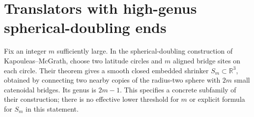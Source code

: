 \chapter{Translators with high-genus spherical-doubling ends}\label{sec:catalogue-sun-wang-sphere-doubling-translators}
\begin{example}\label{ex:catalogue-sun-wang-sphere-doubling-translators}
Fix an integer $m$ sufficiently large. In the spherical-doubling construction of Kapouleas--McGrath, choose two latitude circles and $m$ aligned bridge sites on each circle. Their theorem gives a smooth closed embedded shrinker $S_m\subset\mathbb R^3$, obtained by connecting two nearby copies of the radius-two sphere with $2m$ small catenoidal bridges. Its genus is $2m-1$. This specifies a concrete subfamily of their construction; there is no effective lower threshold for $m$ or explicit formula for $S_m$ in this statement.


\end{example}
